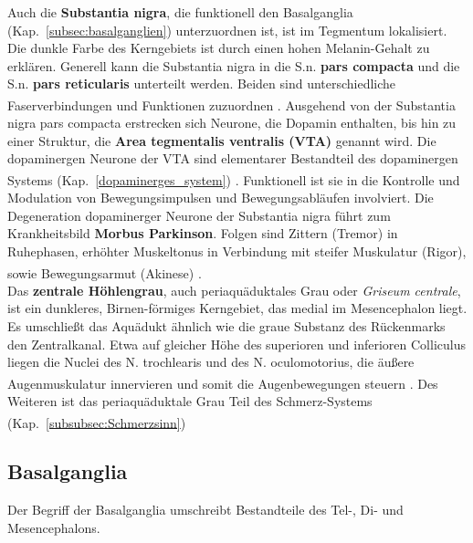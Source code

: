 \documentclass[12pt,a4paper,pdftex]{article}
\begin{document}
\noindent Auch die \textbf{Substantia nigra}, die funktionell den Basalganglia (Kap.~\ref{subsec:basalganglien}) unterzuordnen ist, ist im Tegmentum lokalisiert. Die dunkle Farbe des Kerngebiets ist durch einen hohen Melanin-Gehalt zu erklären. Generell kann die Substantia nigra in die S.n. \textbf{pars compacta} und die S.n. \textbf{pars reticularis} unterteilt werden. Beiden sind unterschiedliche Faserverbindungen und Funktionen zuzuordnen \textsuperscript{\cite[6]{trepel2011neuroanatomie}}. 
Ausgehend von der Substantia nigra pars compacta erstrecken sich Neurone, die Dopamin enthalten, bis hin zu einer Struktur, die \textbf{Area tegmentalis ventralis (VTA)} genannt wird. Die dopaminergen Neurone der VTA sind elementarer Bestandteil des dopaminergen Systems (Kap.~\ref{dopaminerges_system}) \textsuperscript{\cite[9]{crossman2014neuroanatomy}}. Funktionell ist sie in die Kontrolle und Modulation von Bewegungsimpulsen und Bewegungsabläufen involviert. Die Degeneration dopaminerger Neurone der Substantia nigra führt zum Krankheitsbild \textbf{Morbus Parkinson}. Folgen sind Zittern (Tremor) in Ruhephasen, erhöhter Muskeltonus in Verbindung mit steifer Muskulatur (Rigor), sowie Bewegungsarmut (Akinese) \textsuperscript{\cite[6]{trepel2011neuroanatomie}}. \\

\noindent Das \textbf{zentrale Höhlengrau}, auch periaquäduktales Grau oder \textit{Griseum centrale}, ist ein dunkleres, Birnen-förmiges  Kerngebiet, das medial im Mesencephalon liegt. Es umschließt das Aquädukt ähnlich wie die graue Substanz des Rückenmarks den Zentralkanal. Etwa auf gleicher Höhe des superioren und inferioren Colliculus liegen die Nuclei des N. trochlearis und des N. oculomotorius, die äußere Augenmuskulatur innervieren und somit die Augenbewegungen steuern \textsuperscript{\cite[9]{crossman2014neuroanatomy}}. Des Weiteren ist das periaquäduktale Grau Teil des Schmerz-Systems (Kap.~\ref{subsubsec:Schmerzsinn}) \textsuperscript{\cite[25]{paxinos2014rat}}


\subsection{Basalganglia}
\label{subsec:Basalganglia} 

Der Begriff der Basalganglia umschreibt Bestandteile des Tel-, Di- und Mesencephalons.
\end{document}
